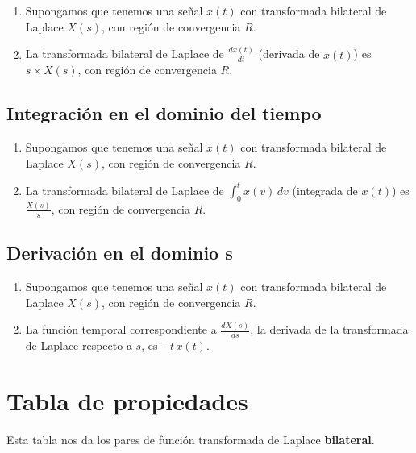 \begin{enumerate}
 \item Supongamos que tenemos una se\~{n}al $x(t)$ con transformada bilateral de Laplace $X(s)$, 
 con regi\'{o}n de convergencia $R$.

\item La transformada bilateral de Laplace de $\frac{dx(t)}{dt}$ (derivada de $x(t)$) es $s \times X(s)$, 
con regi\'{o}n de convergencia $R$.
\end{enumerate}

\subsection{Integraci\'{o}n en el dominio del tiempo}

\begin{enumerate}
	\item Supongamos que tenemos una se\~{n}al $x(t)$ con transformada bilateral de Laplace $X(s)$, con regi\'{o}n de convergencia $R$.
	
	\item La transformada bilateral de Laplace de $\int_{0}^{t} x(v) \, dv$ 
	(integrada de $x(t)$) es $\frac{X(s)}{s}$, con regi\'{o}n de convergencia $R$.
\end{enumerate}


\subsection{Derivaci\'{o}n en el dominio s}

\begin{enumerate}
 \item Supongamos que tenemos una se\~{n}al $x(t)$ con transformada bilateral de Laplace $X(s)$, con regi\'{o}n de convergencia $R$.

\item La funci\'{o}n temporal correspondiente a $\frac{dX(s)}{ds}$, 
la derivada de la transformada de Laplace respecto a $s$, es $-t \, x(t)$.
\end{enumerate}




\section{Tabla de propiedades}
Esta tabla nos da los pares de funci\'{o}n transformada de Laplace \textbf{bilateral}.

